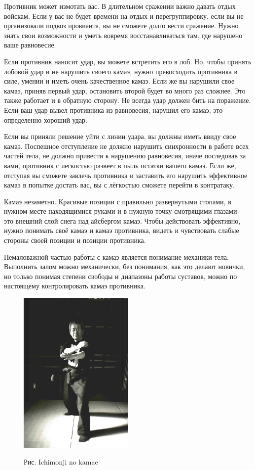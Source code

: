 \documentclass[russian,]{article}
\begin{document}
Противник может измотать вас. В длительном сражении важно давать отдых войскам. Если у вас не будет времени на отдых и перегруппировку, если вы не организовали подвоз провианта, вы не сможете долго вести сражение. Нужно знать свои возможности и уметь вовремя восстанавливаться там, где нарушено ваше равновесие.

Если противник наносит удар, вы можете встретить его в лоб. Но, чтобы принять лобовой удар и не нарушить своего камаэ, нужно превосходить противника в силе, умении и иметь очень качественное камаэ. Если же вы нарушили свое камаэ, приняв первый удар, остановить второй будет во много раз сложнее. Это также работает и в обратную сторону. Не всегда удар должен бить на поражение. Если ваш удар вывел противника из равновесия, нарушил его камаэ, это определенно хороший удар.

Если вы приняли решение уйти с линии удара, вы должны иметь ввиду свое камаэ. Поспешное отступление не должно нарушить синхронности в работе всех частей тела, не должно привести к нарушению равновесия, иначе последовав за вами, противник с легкостью развеет в пыль остатки вашего камаэ. Если же, отступая вы сможете завлечь противника и заставить его нарушить эффективное камаэ в попытке достать вас, вы с лёгкостью сможете перейти в контратаку.

Камаэ незаметно. Красивые позиции с правильно развернутыми стопами, в нужном месте находящимися руками и в нужную точку смотрящими глазами - это внешний слой снега над айсбергом камаэ. Чтобы действовать эффективно, нужно понимать своё камаэ и камаэ противника, видеть и чувствовать слабые стороны своей позиции и позиции противника.

Немаловажной частью работы с камаэ является понимание механики тела. Выполнить залом можно механически, без понимания, как это делают новички, но только понимая степени свободы и диапазоны работы суставов, можно по настоящему контролировать камаэ противника.

\begin{figure}
\centering
\includegraphics[width=0.5\textwidth]{kamae_img.eps}

\large Рис. Ichimonji no kamae
\end{figure}
\end{document}
